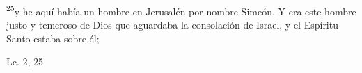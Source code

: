 \documentclass[../../rosario.tex]{subfiles}
\begin{document}
    \textsuperscript{25}y he aquí había un hombre en Jerusalén por nombre Simeón. Y era este hombre justo y temeroso de Dios que aguardaba la consolación de Israel, 
    y el Espíritu Santo estaba sobre él;
    \begin{flushright}
    Lc. 2, 25         
    \end{flushright}
\end{document}
